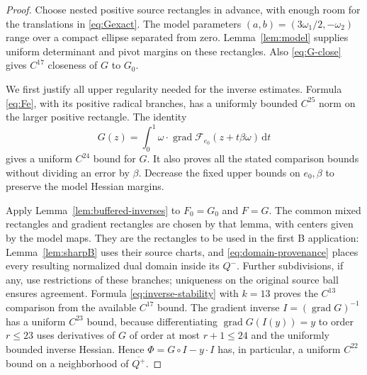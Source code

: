 \documentclass[11pt,a4paper]{article}
\numberwithin{equation}{section}
\theoremstyle{remark}
\newcommand{\dd}{\,\mathrm d}
\DeclareMathOperator{\grad}{grad}
\begin{document}
\begin{proof}
Choose nested positive source rectangles in advance, with enough room
for the translations in \eqref{eq:Gexact}. The model parameters
$(a,b)=(3\omega_1/2,-\omega_2)$ range over a compact ellipse separated
from zero. Lemma~\ref{lem:model} supplies uniform determinant and pivot
margins on these rectangles. Also \eqref{eq:G-close} gives $C^{17}$
closeness of $G$ to $G_0$.

We first justify all upper regularity needed for the inverse estimates.
Formula \eqref{eq:Fe}, with its positive radical branches, has a uniformly
bounded $C^{25}$ norm on the larger positive rectangle. The identity
\[
 G(z)=\int_0^1\omega\cdot\grad\mathcal F_{e_0}
                    (z+t\beta\omega)\dd t
\]
gives a uniform $C^{24}$ bound for $G$. It also proves all the stated
comparison bounds without dividing an error by $\beta$. Decrease the
fixed upper bounds on $e_0,\beta$ to preserve the model Hessian margins.

Apply Lemma~\ref{lem:buffered-inverses} to $F_0=G_0$ and $F=G$.
The common mixed rectangles and gradient rectangles are chosen by that
lemma, with centers given by the model maps. They are the rectangles to
be used in the first B application: Lemma~\ref{lem:sharpB} uses their
source charts, and \eqref{eq:domain-provenance} places every resulting
normalized dual domain inside its $Q^-$. Further subdivisions, if any,
use restrictions of these branches; uniqueness on the original source
ball ensures agreement. Formula \eqref{eq:inverse-stability} with
$k=13$ proves the $C^{13}$ comparison from the available $C^{17}$ bound.
The gradient inverse $I=(\grad G)^{-1}$ has a uniform $C^{23}$ bound,
because differentiating $\grad G(I(y))=y$ to order $r\le23$ uses
derivatives of $G$ of order at most $r+1\le24$ and the uniformly bounded
inverse Hessian. Hence $\Phi=G\circ I-y\cdot I$ has, in particular,
a uniform $C^{22}$ bound on a neighborhood of $\overline{Q^+}$.


\end{proof}
\end{document}
